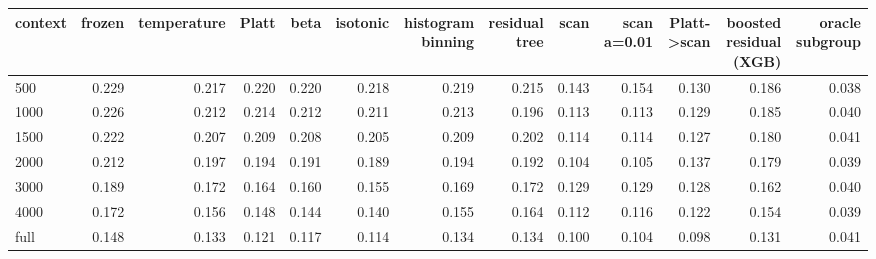 \begin{tabular}{lrrrrrrrrrrrr}
\toprule
context & frozen & temperature & Platt & beta & isotonic & histogram binning & residual tree & scan & scan a=0.01 & Platt->scan & boosted residual (XGB) & oracle subgroup \\
\midrule
500 & 0.229 & 0.217 & 0.220 & 0.220 & 0.218 & 0.219 & 0.215 & 0.143 & 0.154 & 0.130 & 0.186 & 0.038 \\
1000 & 0.226 & 0.212 & 0.214 & 0.212 & 0.211 & 0.213 & 0.196 & 0.113 & 0.113 & 0.129 & 0.185 & 0.040 \\
1500 & 0.222 & 0.207 & 0.209 & 0.208 & 0.205 & 0.209 & 0.202 & 0.114 & 0.114 & 0.127 & 0.180 & 0.041 \\
2000 & 0.212 & 0.197 & 0.194 & 0.191 & 0.189 & 0.194 & 0.192 & 0.104 & 0.105 & 0.137 & 0.179 & 0.039 \\
3000 & 0.189 & 0.172 & 0.164 & 0.160 & 0.155 & 0.169 & 0.172 & 0.129 & 0.129 & 0.128 & 0.162 & 0.040 \\
4000 & 0.172 & 0.156 & 0.148 & 0.144 & 0.140 & 0.155 & 0.164 & 0.112 & 0.116 & 0.122 & 0.154 & 0.039 \\
full & 0.148 & 0.133 & 0.121 & 0.117 & 0.114 & 0.134 & 0.134 & 0.100 & 0.104 & 0.098 & 0.131 & 0.041 \\
\bottomrule
\end{tabular}
